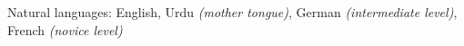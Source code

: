 \inlineheadsection
  {Natural languages:}
  {English,
  Urdu \emph{(mother tongue)},
  German \emph{(intermediate level)},
  French \emph{(novice level)}
  }